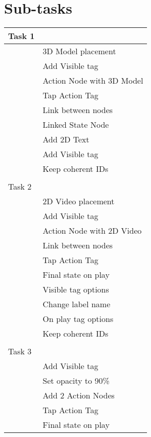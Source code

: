 \section{Sub-tasks}
\label{appendix:subtasks}
\begin{longtable}{ll}
Task 1 &                              \\ \hline
\endfirsthead
%
\endhead
%
       & 3D Model placement           \\
       & Add Visible tag              \\
       & Action Node with 3D Model    \\
       & Tap Action Tag               \\
       & Link between nodes           \\
       & Linked State Node            \\
       & Add 2D Text                  \\
       & Add Visible tag              \\
       & Keep coherent IDs            \\
       &                              \\
Task 2 &                              \\ \hline
       & 2D Video placement           \\
       & Add Visible tag              \\
       & Action Node with 2D Video    \\
       & Link between nodes           \\
       & Tap Action Tag               \\
       & Final state on play          \\
       & Visible tag options          \\
       & Change label name            \\
       & On play tag options          \\
       & Keep coherent IDs            \\
       &                              \\
Task 3 &                              \\ \hline
       & Add Visible tag              \\
       & Set opacity to 90\%          \\
       & Add 2 Action Nodes           \\
       & Tap Action Tag               \\
       & Final state on play          \\

\end{longtable}
